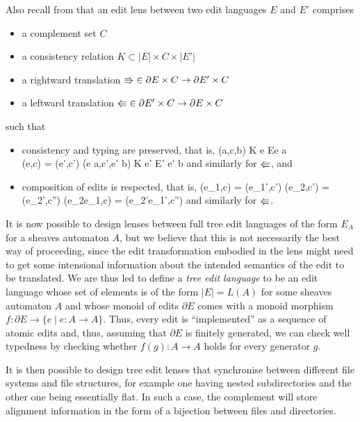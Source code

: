 Also recall from \cite{HofmannPierceWagner12} that an edit lens
between two edit languages $E$ and $E'$ comprises
\begin{itemize}
     \item a complement set $C$
     \item a consistency relation $K \subset |E|\times C \times |E'|$
     \item a rightward translation $\mathord{\Rrightarrow} \in \partial E \times C \to \partial  E' \times C$
     \item a leftward translation $\mathord{\Lleftarrow} \in \partial E' \times C \to \partial E \times C$
 \end{itemize}
 such that
 \begin{itemize}
     \item consistency and typing are preserved, that is,
         \infrule
         {(a,c,b) \in K \andalso e \in \partial E\andalso e \cdot a \Defined \\
          \Dputr(e,c) = (e',c')}
         {(e \cdot a,c',e' \cdot b) \in K \andalso e' \in \partial E' \andalso e' \cdot b \Defined}
         and similarly for $\mathord{\Lleftarrow}$, and
     \item composition of edits is respected, that is,
         \infrule
         {\Dputr(e_1,c) = (e_1',c') \andalso \Dputr(e_2,c') = (e_2',c'')}
         {\Dputr(e_2e_1,c) = (e_2'e_1',c'')}
         and similarly for $\mathord{\Lleftarrow}$.
\end{itemize}
It is now possible to design lenses between full tree edit languages
of the form $E_A$ for a sheaves automaton $A$, but we believe that this
is not necessarily the best way of proceeding, since the edit
transformation embodied in the lens might need to get some intensional
information about the intended semantics of the edit to be
translated. We are thus led to define a \emph{tree edit language} to
be an edit language whose set of elements is of the form $|E|=L(A)$
for some sheaves automaton $A$ and whose monoid of edits $\partial E$
comes with a monoid morphism $f: \partial E\rightarrow \{e\mid
e:A\rightarrow A\}$. Thus, every edit is ``implemented'' as a sequence
of atomic edits and, thus, assuming that $\partial E$ is finitely
generated, we can check well typedness by checking whether
$f(g):A\rightarrow A$ holds for every generator $g$.

It is then possible to design tree edit lenses that synchronise
between different file systems and file structures, for example one
having nested subdirectories and the other one being essentially
flat. In such a case, the complement will store alignment information
in the form of a bijection between files and directories.


